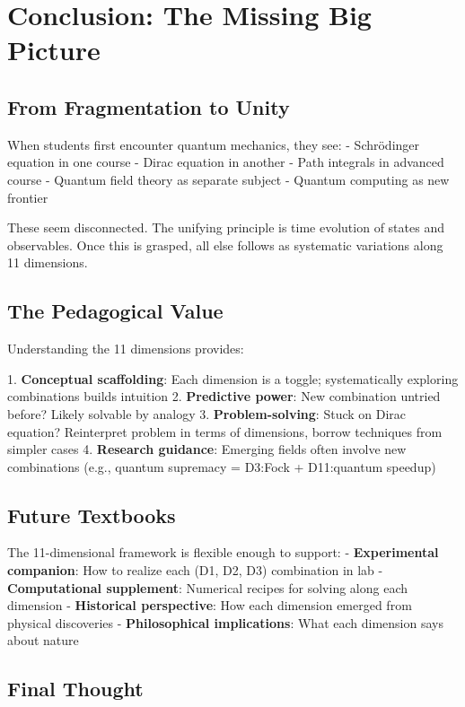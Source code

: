 \documentclass[12pt,openany,oneside]{book}
\begin{document}
{{{{{\chapter{Conclusion: The Missing Big Picture}

\section{From Fragmentation to Unity}

When students first encounter quantum mechanics, they see:
- Schrödinger equation in one course
- Dirac equation in another
- Path integrals in advanced course
- Quantum field theory as separate subject
- Quantum computing as new frontier

These seem disconnected. The unifying principle is time evolution of states and observables. Once this is grasped, all else follows as systematic variations along 11 dimensions.

\section{The Pedagogical Value}

Understanding the 11 dimensions provides:

1. \textbf{Conceptual scaffolding}: Each dimension is a toggle; systematically exploring combinations builds intuition
2. \textbf{Predictive power}: New combination untried before? Likely solvable by analogy
3. \textbf{Problem-solving}: Stuck on Dirac equation? Reinterpret problem in terms of dimensions, borrow techniques from simpler cases
4. \textbf{Research guidance}: Emerging fields often involve new combinations (e.g., quantum supremacy = D3:Fock + D11:quantum speedup)

\section{Future Textbooks}

The 11-dimensional framework is flexible enough to support:
- \textbf{Experimental companion}: How to realize each (D1, D2, D3) combination in lab
- \textbf{Computational supplement}: Numerical recipes for solving along each dimension
- \textbf{Historical perspective}: How each dimension emerged from physical discoveries
- \textbf{Philosophical implications}: What each dimension says about nature

\section{Final Thought}

}}}}}
\end{document}
